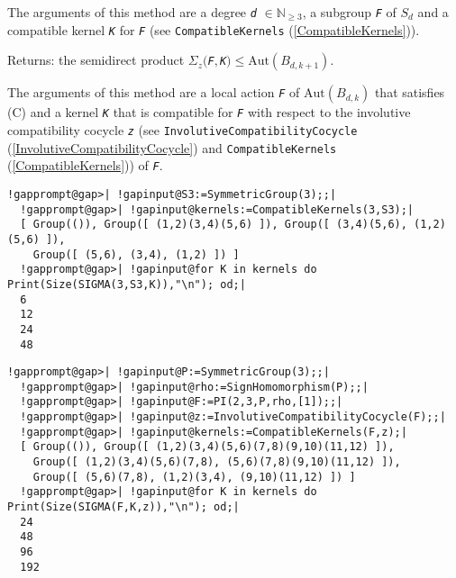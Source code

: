\documentclass[a4paper,11pt]{report}
\begin{document}
{{{\begin{description}
 The arguments of this method are a degree \mbox{\texttt{\mdseries\slshape d}} $\in\mathbb{N}_{\ge 3}$, a subgroup \mbox{\texttt{\mdseries\slshape F}} of $S_{d}$ and a compatible kernel \mbox{\texttt{\mdseries\slshape K}} for \mbox{\texttt{\mdseries\slshape F}} (see \texttt{CompatibleKernels} (\ref{CompatibleKernels})). 
\item[{for the arguments \mbox{\texttt{\mdseries\slshape F}}, \mbox{\texttt{\mdseries\slshape K}}, \mbox{\texttt{\mdseries\slshape z}}}]  Returns: the semidirect product $\Sigma_{z}($\mbox{\texttt{\mdseries\slshape F}}$,$\mbox{\texttt{\mdseries\slshape K}}$)\le\mathrm{Aut}(B_{d,k+1})$. 

 The arguments of this method are a local action \mbox{\texttt{\mdseries\slshape F}} of $\mathrm{Aut}(B_{d,k})$ that satisfies (C) and a kernel \mbox{\texttt{\mdseries\slshape K}} that is compatible for \mbox{\texttt{\mdseries\slshape F}} with respect to the involutive compatibility cocycle \mbox{\texttt{\mdseries\slshape z}} (see \texttt{InvolutiveCompatibilityCocycle} (\ref{InvolutiveCompatibilityCocycle}) and \texttt{CompatibleKernels} (\ref{CompatibleKernels})) of \mbox{\texttt{\mdseries\slshape F}}. 
\end{description}
 

 }

 

 
\begin{Verbatim}[commandchars=!@|,fontsize=\small,frame=single,label=Example]
  !gapprompt@gap>| !gapinput@S3:=SymmetricGroup(3);;|
  !gapprompt@gap>| !gapinput@kernels:=CompatibleKernels(3,S3);|
  [ Group(()), Group([ (1,2)(3,4)(5,6) ]), Group([ (3,4)(5,6), (1,2)(5,6) ]), 
    Group([ (5,6), (3,4), (1,2) ]) ]
  !gapprompt@gap>| !gapinput@for K in kernels do Print(Size(SIGMA(3,S3,K)),"\n"); od;|
  6
  12
  24
  48
\end{Verbatim}
 

 
\begin{Verbatim}[commandchars=!@|,fontsize=\small,frame=single,label=Example]
  !gapprompt@gap>| !gapinput@P:=SymmetricGroup(3);;|
  !gapprompt@gap>| !gapinput@rho:=SignHomomorphism(P);;|
  !gapprompt@gap>| !gapinput@F:=PI(2,3,P,rho,[1]);;|
  !gapprompt@gap>| !gapinput@z:=InvolutiveCompatibilityCocycle(F);;|
  !gapprompt@gap>| !gapinput@kernels:=CompatibleKernels(F,z);|
  [ Group(()), Group([ (1,2)(3,4)(5,6)(7,8)(9,10)(11,12) ]), 
    Group([ (1,2)(3,4)(5,6)(7,8), (5,6)(7,8)(9,10)(11,12) ]), 
    Group([ (5,6)(7,8), (1,2)(3,4), (9,10)(11,12) ]) ]
  !gapprompt@gap>| !gapinput@for K in kernels do Print(Size(SIGMA(F,K,z)),"\n"); od;|
  24
  48
  96
  192
\end{Verbatim}
 }

 }
\end{document}
